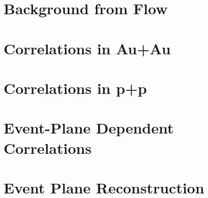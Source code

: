 \section{Background from Flow}

\section{Correlations in Au+Au}

\section{Correlations in p+p}

\section{Event-Plane Dependent Correlations}

\section{Event Plane Reconstruction}

